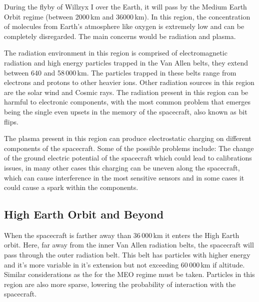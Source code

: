 During the flyby of Willzyx I over the Earth, it will pass by the Medium Earth Orbit regime (between 2000\,km and 36000\,km). In this region, the concentration of molecules from Earth's atmosphere like oxygen is extremely low and can be completely disregarded. The main concerns would be radiation and plasma.

The radiation environment in this region is comprised of electromagnetic radiation and high energy particles trapped in the Van Allen belts, they extend between 640 and 58\,000\,km. The particles trapped in these belts range from electrons and protons to other heavier ions. Other radiation sources in this region are the solar wind and Cosmic rays. The radiation present in this region can be harmful to electronic components, with the most common problem that emerges being the single even upsets in the memory of the spacecraft, also known as bit flips.

The plasma present in this region can produce electrostatic charging on different components of the spacecraft. Some of the possible problems include: The change of the ground electric potential of the spacecraft which could lead to calibrations issues, in many other cases this charging can be uneven along the spacecraft, which can cause interference in the most sensitive sensors and in some cases it could cause a spark within the components. 

\subsection{High Earth Orbit and Beyond}

When the spacecraft is farther away than 36\,000\,km it enters the High Earth orbit. Here, far away from the inner Van Allen radiation belts, the spacecraft will pass through the outer radiation belt. This belt has particles with higher energy and it's more variable in it's extension but not exceeding 60\,000\,km if altitude. Similar considerations as the for the MEO regime must be taken. Particles in this region are also more sparse, lowering the probability of interaction with the spacecraft.
